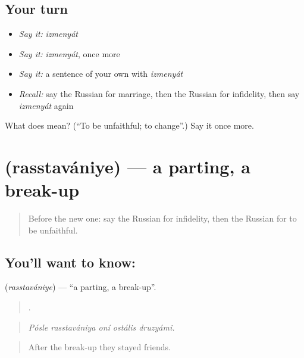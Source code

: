 \subsection*{Your turn}
\begin{itemize}
\raggedright
  \item \emph{Say it:} \emph{izmenyát}
  \item \emph{Say it:} \emph{izmenyát}, once more
  \item \emph{Say it:} a sentence of your own with \emph{izmenyát}
  \item \emph{Recall:} say the Russian for marriage, then the Russian for infidelity, then say \emph{izmenyát} again
\end{itemize}

\begin{tcolorbox}[breakable,colback=teal!4,colframe=teal!35!black,title={Before you move on}]
What does  mean? (\textquotedblleft{}To be unfaithful; to change\textquotedblright{}.) Say it once more.
\end{tcolorbox}
\section[\texorpdfstring{\ru{расставание} (rasstavániye)}{расставание (rasstavániye)}]{ (rasstavániye) — a parting, a break-up}

\label{lesson:RU-C494-rasstavaniye}



\begin{quote}
Before the new one: say the Russian for infidelity, then the Russian for to be unfaithful.
\end{quote}

\subsection*{You'll want to know: }
\textbf{} (\emph{rasstavániye}) — \textquotedblleft{}a parting, a break-up\textquotedblright{}.

\begin{quote}
    .
\end{quote}

\begin{quote}
\emph{Pósle rasstavániya oní ostális druzyámi.}
\end{quote}

\begin{quote}
After the break-up they stayed friends.
\end{quote}

